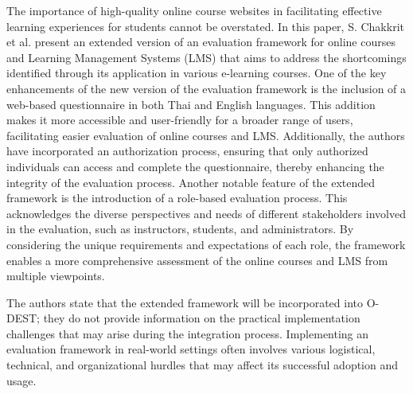 The importance of high-quality online course websites in facilitating effective learning experiences for students cannot be overstated. In this paper, S. Chakkrit et al. present an extended version of an evaluation framework for online courses and Learning Management Systems (LMS) that aims to address the shortcomings identified through its application in various e-learning courses. One of the key enhancements of the new version of the evaluation framework is the inclusion of a web-based questionnaire in both Thai and English languages. This addition makes it more accessible and user-friendly for a broader range of users, facilitating easier evaluation of online courses and LMS. Additionally, the authors have incorporated an authorization process, ensuring that only authorized individuals can access and complete the questionnaire, thereby enhancing the integrity of the evaluation process. Another notable feature of the extended framework is the introduction of a role-based evaluation process. This acknowledges the diverse perspectives and needs of different stakeholders involved in the evaluation, such as instructors, students, and administrators. By considering the unique requirements and expectations of each role, the framework enables a more comprehensive assessment of the online courses and LMS from multiple viewpoints. 

The authors state that the extended framework will be incorporated into O-DEST; they do not provide information on the practical implementation challenges that may arise during the integration process. Implementing an evaluation framework in real-world settings often involves various logistical, technical, and organizational hurdles that may affect its successful adoption and usage. \cite{snae2008web}



